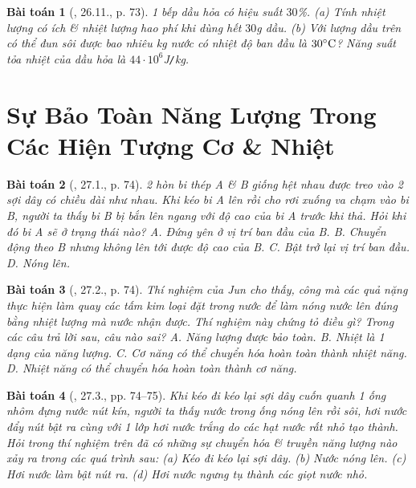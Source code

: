 \documentclass{article}
\newtheorem{baitoan}{Bài toán}
\begin{document}
\begin{baitoan}[\cite{SBT_Vat_Ly_8}, 26.11., p. 73]
	1 bếp dầu hỏa có hiệu suất $30$\%. (a) Tính nhiệt lượng có ích \& nhiệt lượng hao phí khi dùng hết $30$\emph{g} dầu. (b) Với lượng dầu trên có thể đun sôi được bao nhiêu \emph{kg} nước có nhiệt độ ban đầu là $30^\circ{\rm C}$? Năng suất tỏa nhiệt của dầu hỏa là $44\cdot10^6$\emph{J\texttt{/}kg}.
\end{baitoan}


\section{Sự Bảo Toàn Năng Lượng Trong Các Hiện Tượng Cơ \& Nhiệt}

\begin{baitoan}[\cite{SBT_Vat_Ly_8}, 27.1., p. 74]
	2 hòn bi thép A \& B giống hệt nhau được treo vào 2 sợi dây có chiều dài như nhau. Khi kéo bi A lên rồi cho rơi xuống va chạm vào bi B, người ta thấy bi B bị bắn lên ngang với độ cao của bi A trước khi thả. Hỏi khi đó bi A sẽ ở trạng thái nào? {\sf A.} Đứng yên ở vị trí ban đầu của B. {\sf B.} Chuyển động theo B nhưng không lên tới được độ cao của B. {\sf C.} Bật trở lại vị trí ban đầu. {\sf D.} Nóng lên.
\end{baitoan}

\begin{baitoan}[\cite{SBT_Vat_Ly_8}, 27.2., p. 74]
	Thí nghiệm của Jun cho thấy, công mà các quả nặng thực hiện làm quay các tấm kim loại đặt trong nước để làm nóng nước lên đúng bằng nhiệt lượng mà nước nhận được. Thí nghiệm này chứng tỏ điều gì? Trong các câu trả lời sau, câu nào sai? {\sf A.} Năng lượng được bảo toàn. {\sf B.} Nhiệt là 1 dạng của năng lượng. {\sf C.} Cơ năng có thể chuyển hóa hoàn toàn thành nhiệt năng. {\sf D.} Nhiệt năng có thể chuyển hóa hoàn toàn thành cơ năng.
\end{baitoan}

\begin{baitoan}[\cite{SBT_Vat_Ly_8}, 27.3., pp. 74--75]
	Khi kéo đi kéo lại sợi dây cuốn quanh 1 ống nhôm đựng nước nút kín, người ta thấy nước trong ống nóng lên rồi sôi, hơi nước đẩy nút bật ra cùng với 1 lớp hơi nước trắng do các hạt nước rất nhỏ tạo thành. Hỏi trong thí nghiệm trên đã có những sự chuyển hóa \& truyền năng lượng nào xảy ra trong các quá trình sau: (a) Kéo đi kéo lại sợi dây. (b) Nước nóng lên. (c) Hơi nước làm bật nút ra. (d) Hơi nước ngưng tụ thành các giọt nước nhỏ.
\end{baitoan}
\end{document}
